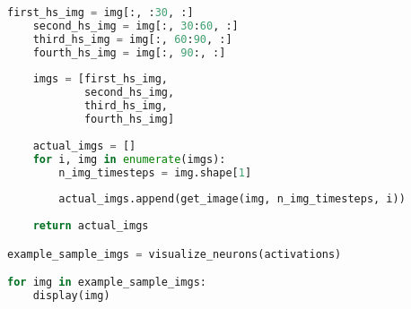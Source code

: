 \begin{lstlisting}[language=Python]
    first_hs_img = img[:, :30, :]
    second_hs_img = img[:, 30:60, :]
    third_hs_img = img[:, 60:90, :]
    fourth_hs_img = img[:, 90:, :]
    
    imgs = [first_hs_img,
            second_hs_img,
            third_hs_img,
            fourth_hs_img]
    
    actual_imgs = []
    for i, img in enumerate(imgs):
        n_img_timesteps = img.shape[1]
        
        actual_imgs.append(get_image(img, n_img_timesteps, i))
    
    return actual_imgs

example_sample_imgs = visualize_neurons(activations)

for img in example_sample_imgs:
    display(img)
\end{lstlisting}
